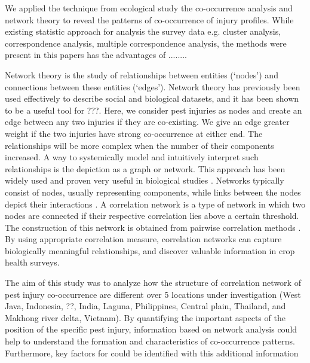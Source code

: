 We applied the technique from ecological study the co-occurrence analysis and network theory to reveal the patterns of co-occurrence of injury profiles. While existing statistic approach for analysis the survey data e.g. cluster analysis, correspondence analysis, multiple correspondence analysis, the methods were present in this papers has the advantages of ........

Network theory is the study of relationships between entities (`nodes') and connections between these entities (`edges'). Network theory has previously been used effectively to describe social and biological datasets, and it has been shown to be a useful tool for ???. Here, we consider pest injuries as nodes and create an edge between any two injuries if they are co-existing. We give an edge greater weight if the two injuries have strong co-occurrence at either end.  The relationships will be more complex when the number of their components increased. A way to systemically model and intuitively interpret such relationships is the depiction as a graph or network. This approach has been widely used and proven very useful in biological studies \citep{Lefebvre:2011fo}. Networks typically consist of nodes, usually representing components, while links between the nodes depict their interactions \citep{PROULX:2005hx}. A correlation network is a type of network in which two nodes are connected if their respective correlation lies above a certain threshold. The construction of this network is obtained from pairwise correlation methods \citep{Toubiana:2013cv}. By using appropriate correlation measure, correlation networks can capture biologically meaningful relationships, and discover valuable information in crop health surveys.

The aim of this study was to analyze how the structure of correlation network of pest injury co-occurrence are different over 5 locations under investigation (West Java, Indonesia, ??, India, Laguna, Philippines, Central plain, Thailand, and Makhong river delta, Vietnam). By quantifying the important aspects of the position of the specific pest injury, information based on network analysis could help to understand the formation and characteristics of co-occurrence patterns. Furthermore, key factors for could be identified with this additional information